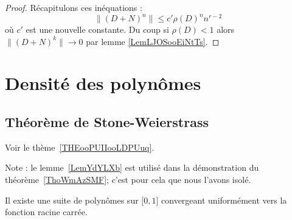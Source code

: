 \begin{proof}
	Récapitulons ces inéquations :
	\begin{equation}
		\| (D+N)^n \|\leq c'\rho(D)^nn^{r-2}
	\end{equation}
	où \( c'\) est une nouvelle constante. Du coup si \( \rho(D)<1\) alors \( \| (D+N)^k \|\to 0\) par lemme \ref{LemLJOSooEiNtTs}.
\end{proof}


\section{Densité des polynômes}

\subsection{Théorème de Stone-Weierstrass}

Voir le thème~\ref{THEooPUIIooLDPUuq}.

Note : le lemme~\ref{LemYdYLXb} est utilisé dans la démonstration du théorème~\ref{ThoWmAzSMF}; c'est pour cela que nous l'avons isolé.

\begin{lemma}       \label{LemYdYLXb}
	Il existe une suite de polynômes sur \( \mathopen[ 0 , 1 \mathclose]\) convergeant uniformément vers la fonction racine carrée.
\end{lemma}

